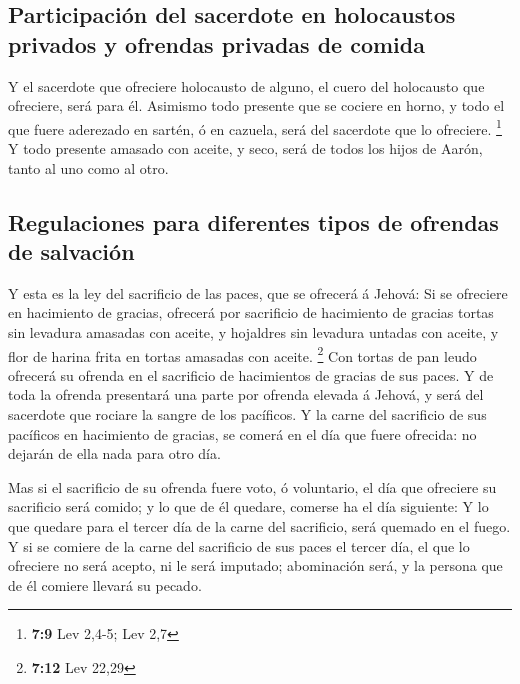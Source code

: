 \hypertarget{participaciuxf3n-del-sacerdote-en-holocaustos-privados-y-ofrendas-privadas-de-comida}{%
\subsection{Participación del sacerdote en holocaustos privados y
ofrendas privadas de
comida}\label{participaciuxf3n-del-sacerdote-en-holocaustos-privados-y-ofrendas-privadas-de-comida}}

 Y el sacerdote que ofreciere holocausto de alguno, el cuero
del holocausto que ofreciere, será para él.  Asimismo todo
presente que se cociere en horno, y todo el que fuere aderezado en
sartén, ó en cazuela, será del sacerdote que lo ofreciere. \footnote{\textbf{7:9}
  Lev 2,4-5; Lev 2,7}  Y todo presente amasado con aceite,
y seco, será de todos los hijos de Aarón, tanto al uno como al otro.

\hypertarget{regulaciones-para-diferentes-tipos-de-ofrendas-de-salvaciuxf3n}{%
\subsection{Regulaciones para diferentes tipos de ofrendas de
salvación}\label{regulaciones-para-diferentes-tipos-de-ofrendas-de-salvaciuxf3n}}

 Y esta es la ley del sacrificio de las paces, que se
ofrecerá á Jehová:  Si se ofreciere en hacimiento de
gracias, ofrecerá por sacrificio de hacimiento de gracias tortas sin
levadura amasadas con aceite, y hojaldres sin levadura untadas con
aceite, y flor de harina frita en tortas amasadas con aceite.
\footnote{\textbf{7:12} Lev 22,29}  Con tortas de pan leudo
ofrecerá su ofrenda en el sacrificio de hacimientos de gracias de sus
paces.  Y de toda la ofrenda presentará una parte por
ofrenda elevada á Jehová, y será del sacerdote que rociare la sangre de
los pacíficos.  Y la carne del sacrificio de sus pacíficos
en hacimiento de gracias, se comerá en el día que fuere ofrecida: no
dejarán de ella nada para otro día.

 Mas si el sacrificio de su ofrenda fuere voto, ó
voluntario, el día que ofreciere su sacrificio será comido; y lo que de
él quedare, comerse ha el día siguiente:  Y lo que quedare
para el tercer día de la carne del sacrificio, será quemado en el fuego.
 Y si se comiere de la carne del sacrificio de sus paces el
tercer día, el que lo ofreciere no será acepto, ni le será imputado;
abominación será, y la persona que de él comiere llevará su pecado.

